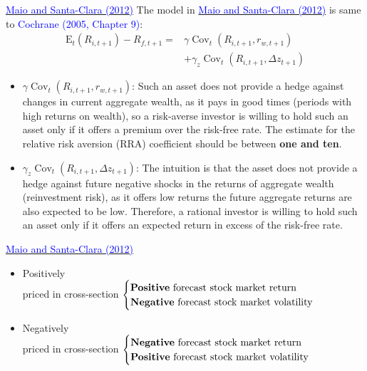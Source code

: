 \documentclass{beamer}
\begin{document}
\begin{frame}{\href{https://doi.org/10.1016/j.jfineco.2012.07.001}{\textcolor{blue}{Maio and Santa-Clara (2012)}}}
	The model in {\href{https://doi.org/10.1016/j.jfineco.2012.07.001}{\textcolor{blue}{Maio and Santa-Clara (2012)}}} is same to \textcolor{blue}{Cochrane (2005, Chapter 9)}:
	\begin{equation}\label{equ:cochrane}
		\begin{aligned}
			\mathrm{E}_{t}\left(R_{i, t+1}\right)-R_{f, t+1}=& \gamma \operatorname{Cov}_{t}\left(R_{i, t+1}, r_{w, t+1}\right) \\
			&+\gamma_{z} \operatorname{Cov}_{t}\left(R_{i, t+1}, \Delta z_{t+1}\right)
		\end{aligned}
	\end{equation}
	\begin{itemize}
		\item $ \gamma \operatorname{Cov}_{t}\left(R_{i, t+1}, r_{w, t+1}\right) $: Such an asset does not provide a hedge against changes in current aggregate wealth, as it pays in good
		times (periods with high returns on wealth), so a risk-averse investor is willing to hold such an asset only if it offers a premium over the risk-free rate.  The estimate for
		the relative risk aversion (RRA) coefficient should be between \textbf{one and ten}.
		\item $ \gamma_{z} \operatorname{Cov}_{t}\left(R_{i, t+1}, \Delta z_{t+1}\right) $: The
		intuition is that the asset does not provide a hedge against
		future negative shocks in the returns of aggregate wealth
		(reinvestment risk), as it offers low returns the future aggregate returns are also expected to be low. Therefore, a rational investor is willing to hold such an asset only if it offers an expected return in excess of the risk-free rate.
	\end{itemize}
\end{frame}

\begin{frame}{\href{https://doi.org/10.1016/j.jfineco.2012.07.001}{\textcolor{blue}{Maio and Santa-Clara (2012)}}}
	\begin{itemize}
		\item Positively \\priced in cross-section $ \begin{cases}
			\text{\textbf{Positive} forecast stock market return} \\
			\text{\textbf{Negative} forecast stock market volatility}
		\end{cases} $
		\item Negatively \\priced in cross-section $ \begin{cases}
			\text{\textbf{Negative} forecast stock market return} \\
			\text{\textbf{Positive} forecast stock market volatility}
		\end{cases} $
	\end{itemize}
\end{frame}
\end{document}
